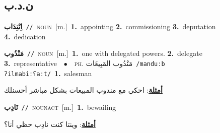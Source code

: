 \documentclass[10pt,a4paper,twoside]{article} %
\begin{document}
\begin{multicols}{2}
\vspace{-3mm}
\subsection*{\color{blue}\foreignlanguage{arabic}{ن.د.ب}\color{blue}{}} 

{\setlength\topsep{0pt}\textbf{\foreignlanguage{arabic}{اِنْتِدَاب}}\ {\color{gray}\texttt{//}\color{black}}\ \textsc{noun}\ [m.]\ \textbf{1.}~appointing  \textbf{2.}~commissioning  \textbf{3.}~deputation  \textbf{4.}~dedication\ } \vspace{2mm}

{\setlength\topsep{0pt}\textbf{\foreignlanguage{arabic}{مَنْدُوب}}\ {\color{gray}\texttt{//}\color{black}}\ \textsc{noun}\ [m.]\ \textbf{1.}~one with delegated powers.  \textbf{2.}~delegate  \textbf{3.}~representative\ \ $\bullet$\ \ \textsc{ph.} \color{gray} \foreignlanguage{arabic}{مَنْدُوب المَبِيعَات}\color{black}\ {\color{gray}\texttt{/{\sffamily manduːb ʔilmabiːʕaːt}/}\color{black}}\ \textbf{1.}~salesman\  \begin{flushright}\color{gray}\foreignlanguage{arabic}{\textbf{\underline{\foreignlanguage{arabic}{أمثلة}}}: احكي مع مندوب المبيعات بشكل مباشر أحسنلك}\end{flushright}\color{black}} \vspace{2mm}

{\setlength\topsep{0pt}\textbf{\foreignlanguage{arabic}{نَادِب}}\ {\color{gray}\texttt{//}\color{black}}\ \textsc{noun\textunderscore act}\ [m.]\ \textbf{1.}~bewailing\  \begin{flushright}\color{gray}\foreignlanguage{arabic}{\textbf{\underline{\foreignlanguage{arabic}{أمثلة}}}: وينتا كنت نادِب حظي أنا؟}\end{flushright}\color{black}} \vspace{2mm}


\end{multicols}
\end{document}

